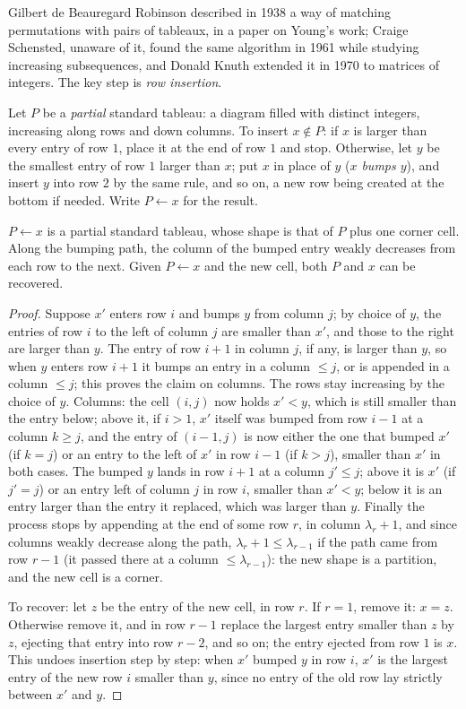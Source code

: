 Gilbert de Beauregard Robinson described in 1938 a way of matching permutations with pairs of tableaux, in a paper on Young's work; Craige Schensted, unaware of it, found the same algorithm in 1961 while studying increasing subsequences,
and Donald Knuth extended it in 1970 to matrices of integers. The key step is \emph{row insertion}.

Let $P$ be a \emph{partial} standard tableau: a diagram filled with distinct integers, increasing along rows and down columns. To insert $x\notin P$: if $x$ is larger than every entry of row $1$, place it at the end of row $1$ and stop. Otherwise,
let $y$ be the smallest entry of row $1$ larger than $x$; put $x$ in place of $y$ (\emph{$x$ bumps $y$}), and insert $y$ into row $2$ by the same rule, and so on, a new row being created at the bottom if needed. Write $P\leftarrow x$ for the result.

\begin{lemma}\label{lem:insertion}
$P\leftarrow x$ is a partial standard tableau, whose shape is that of $P$ plus one corner cell. Along the bumping path, the column of the bumped entry weakly decreases from each row to the next. Given $P\leftarrow x$ and the new cell,
both $P$ and $x$ can be recovered.
\end{lemma}

\begin{proof}
Suppose $x'$ enters row $i$ and bumps $y$ from column $j$; by choice of $y$, the entries of row $i$ to the left of column $j$ are smaller than $x'$, and those to the right are larger than $y$. The entry of row $i+1$ in column $j$, if any, is larger than $y$,
so when $y$ enters row $i+1$ it bumps an entry in a column $\le j$, or is appended in a column $\le j$; this proves the claim on columns. The rows stay increasing by the choice of $y$. Columns: the cell $(i,j)$ now holds $x'<y$, which
is still smaller than the entry below; above it, if $i>1$, $x'$ itself was bumped from row $i-1$ at a column $k\ge j$, and the entry of $(i-1,j)$ is now either the one that bumped $x'$ (if $k=j$) or an entry to the left of $x'$ in row $i-1$
(if $k>j$), smaller than $x'$ in both cases. The bumped $y$ lands in row $i+1$ at a column $j'\le j$; above it is $x'$ (if $j'=j$) or an entry left of column $j$ in row $i$, smaller than $x'<y$; below it is an entry larger than the
entry it replaced, which was larger than $y$. Finally the process stops by appending at the end of some row $r$, in column $\lambda_r+1$, and since columns weakly decrease along the path, $\lambda_r+1\le\lambda_{r-1}$ if the path
came from row $r-1$ (it passed there at a column $\le\lambda_{r-1}$): the new shape is a partition, and the new cell is a corner.

To recover: let $z$ be the entry of the new cell, in row $r$. If $r=1$, remove it: $x=z$. Otherwise remove it, and in row $r-1$ replace the largest entry smaller than $z$ by $z$, ejecting that entry into row $r-2$, and so on;
the entry ejected from row $1$ is $x$. This undoes insertion step by step: when $x'$ bumped $y$ in row $i$, $x'$ is the largest entry of the new row $i$ smaller than $y$, since no entry of the old row lay strictly between $x'$ and $y$.
\end{proof}

